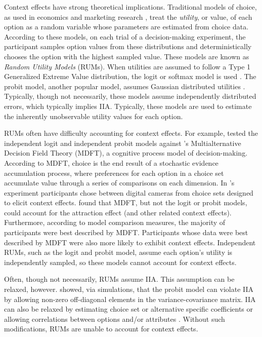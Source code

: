 Context effects have strong theoretical implications. Traditional models of choice, as used in economics and marketing research \parencite{mcfadden2001economic}, treat the \textit{utility}, or value, of each option as a random variable whose parameters are estimated from choice data. According to these models, on each trial of a decision-making experiment, the participant samples option values from these distributions and deterministically chooses the option with the highest sampled value. These models are known as \textit{Random Utility Models} (RUMs). When utilities are assumed to follow a Type 1 Generalized Extreme Value distribution, the logit or softmax model is used \parencite{gensch1979multinomial}. The probit model, another popular model, assumes Gaussian distributed utilities \parencite{bolduc1999practical}. Typically, though not necessarily, these models assume independently distributed errors, which typically implies IIA. Typically, these models are used to estimate the inherently unobservable utility values for each option. 

RUMs often have difficulty accounting for context effects. For example, \textcite{berkowitschRigorouslyTestingMultialternative2014b} tested the independent logit and independent probit models against \textcite{roeMultialternativeDecisionField2001a}'s Multialternative Decision Field Theory (MDFT), a cognitive process model of decision-making. According to MDFT, choice is the end result of a stochastic evidence accumulation process, where preferences for each option in a choice set accumulate value through a series of comparisons on each dimension. In \textcite{berkowitschRigorouslyTestingMultialternative2014b}'s experiment participants chose between digital cameras from choice sets designed to elicit context effects. \textcite{berkowitschRigorouslyTestingMultialternative2014b} found that MDFT, but not the logit or probit models, could account for the attraction effect (and other related context effects). Furthermore, according to model comparison measures, the majority of participants were best described by MDFT. Participants whose data were best described by MDFT were also more likely to exhibit context effects. Independent RUMs, such as the logit and probit model, assume each option's utility is independently sampled, so these models cannot account for context effects.

Often, though not necessarily, RUMs assume IIA. This assumption can be relaxed, however. \textcite{paetzUtilityIndependenceIIA2018} showed, via simulations, that the probit model can violate IIA by allowing non-zero off-diagonal elements in the variance-covariance matrix. IIA can also be relaxed by estimating choice set or alternative specific coefficients \parencite{rooderkerk2011incorporating} or allowing correlations between options and/or attributes \parencite{haaijer1998utility}. Without such modifications, RUMs are unable to account for context effects. 

